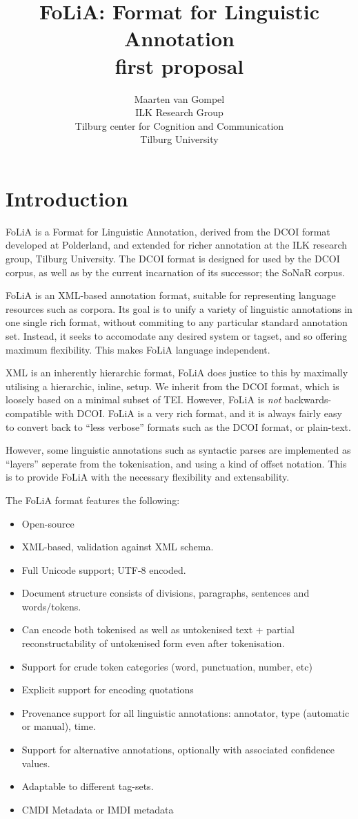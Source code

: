 \documentclass[a4paper,12pt]{report}
\title{FoLiA: Format for Linguistic Annotation \\ \small first proposal}
\author{Maarten van Gompel \\ ILK Research Group \\ Tilburg center for Cognition and Communication \\ Tilburg University }
\begin{document}
\tableofcontents
\titlepage

\chapter{Introduction}

FoLiA is a Format for Linguistic Annotation, derived from the DCOI\cite{DCOI} format developed at Polderland, and extended for richer annotation at the ILK research group, Tilburg University. The DCOI format is designed for used by the DCOI corpus, as well as by the current incarnation of its successor; the SoNaR corpus. 

FoLiA is an XML-based annotation format, suitable for representing language resources such as corpora. Its goal is to unify a variety of linguistic annotations in one single rich format, without commiting to any particular standard annotation set. Instead, it seeks to accomodate any desired system or tagset, and so offering maximum flexibility. This makes FoLiA language independent.


XML is an inherently hierarchic format, FoLiA does justice to this by maximally utilising a hierarchic, inline, setup. We inherit from the DCOI format, which is loosely based on a minimal subset of TEI. However, FoLiA is \emph{not} backwards-compatible with DCOI. FoLiA is a very rich format, and it is always fairly easy to convert back to ``less verbose'' formats such as the DCOI format, or plain-text. 

However, some linguistic annotations such as syntactic parses are implemented as ``layers'' seperate from the tokenisation, and using a kind of offset notation. This is to provide FoLiA with the necessary flexibility and extensability.


The FoLiA format features the following:

\begin{itemize}
\item Open-source
\item XML-based, validation against XML schema.
\item Full Unicode support; UTF-8 encoded.
\item Document structure consists of divisions, paragraphs, sentences and words/tokens.
\item Can encode both tokenised as well as untokenised text + partial reconstructability of untokenised form even after tokenisation.
\item Support for crude token categories (word, punctuation, number, etc)
\item Explicit support for encoding quotations
\item Provenance support for all linguistic annotations: annotator, type (automatic or manual), time.
\item Support for alternative annotations, optionally with associated confidence values.
\item Adaptable to different tag-sets.
\item CMDI Metadata or IMDI metadata
\end{itemize}
\end{document}
